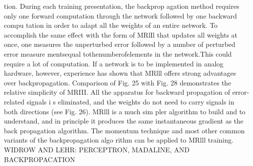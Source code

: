 \documentclass[11pt,a4paper,twocolumn]{article}
\begin{document}
{{tion. During each training presentation, the backprop
agation method requires only one forward computation 
through the network followed by one backward compu
tation in order to adapt all the weights of an entire network. 
To accomplish the same effect with the form of MRlIl that 
updates all weights at once, one measures the unperturbed 
error followed by a number of perturbed error measure
mentsequal tothenumberofelements in the network.This 
could require a lot of computation. 
If a network is to be implemented in analog hardware, 
however, experience has shown that MRlll offers strong 
advantages over backpropagation. Comparison of Fig. 25 
with Fig. 28 demonstrates the relative simplicity of MRIII. 
All the apparatus for backward propagation of error-related 
signals i s  eliminated, and the weights do not need to carry 
signals in both directions (see Fig. 26). MRlll is a much sim
pler algorithm to build and to understand, and in principle 
it produces the same instantaneous gradient as the back
propagation algorithm. The momentum technique and 
most other common variants of the backpropagation algo
rithm can be applied to MRlll training. 
WIDROW AND LEHR: PERCEPTRON, MADALINE, AND BACKPROPACATION 






\newpage


}}
\end{document}
